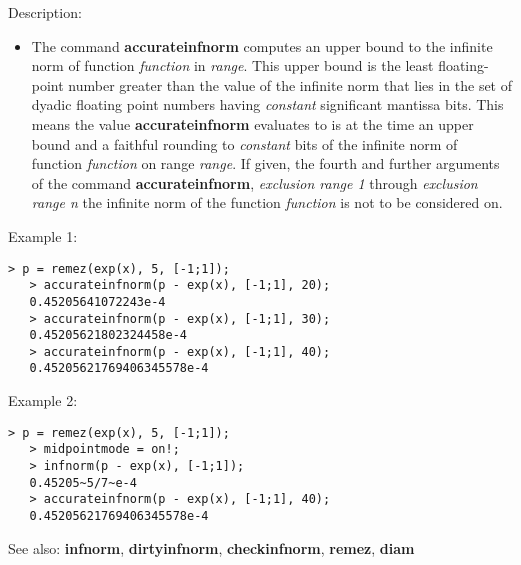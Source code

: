 \noindent Description: \begin{itemize}

\item The command \textbf{accurateinfnorm} computes an upper bound to the infinite norm of
   function \emph{function} in \emph{range}. This upper bound is the least
   floating-point number greater than the value of the infinite norm that
   lies in the set of dyadic floating point numbers having \emph{constant}
   significant mantissa bits. This means the value \textbf{accurateinfnorm} evaluates to
   is at the time an upper bound and a faithful rounding to \emph{constant}
   bits of the infinite norm of function \emph{function} on range \emph{range}.
   If given, the fourth and further arguments of the command \textbf{accurateinfnorm},
   \emph{exclusion range 1} through \emph{exclusion range n} the infinite norm of
   the function \emph{function} is not to be considered on.
\end{itemize}
\noindent Example 1: 
\begin{center}\begin{minipage}{14.8cm}\begin{Verbatim}[frame=single]
   > p = remez(exp(x), 5, [-1;1]);
   > accurateinfnorm(p - exp(x), [-1;1], 20);
   0.45205641072243e-4
   > accurateinfnorm(p - exp(x), [-1;1], 30);
   0.45205621802324458e-4
   > accurateinfnorm(p - exp(x), [-1;1], 40);
   0.45205621769406345578e-4
\end{Verbatim}
\end{minipage}\end{center}
\noindent Example 2: 
\begin{center}\begin{minipage}{14.8cm}\begin{Verbatim}[frame=single]
   > p = remez(exp(x), 5, [-1;1]);
   > midpointmode = on!;
   > infnorm(p - exp(x), [-1;1]);
   0.45205~5/7~e-4
   > accurateinfnorm(p - exp(x), [-1;1], 40);
   0.45205621769406345578e-4
\end{Verbatim}
\end{minipage}\end{center}
See also: \textbf{infnorm}, \textbf{dirtyinfnorm}, \textbf{checkinfnorm}, \textbf{remez}, \textbf{diam}
